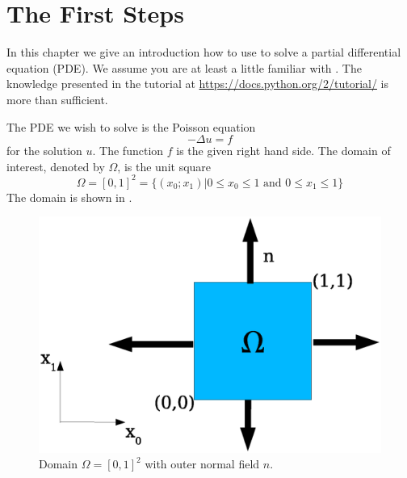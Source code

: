 
%
%
%

\section{The First Steps}\label{FirstSteps} 
In this chapter we give an introduction how to use \escript to solve 
a partial differential equation (PDE).
We assume you are at least a little familiar with \PYTHON.
The knowledge presented in the \PYTHON tutorial at \url{https://docs.python.org/2/tutorial/} is more than sufficient.

The PDE we wish to solve is the Poisson equation 
\begin{equation}
    -\Delta u=f 
    \label{eq:FirstSteps.1}
\end{equation}
for the solution $u$. The function $f$ is the given right hand side. The domain of interest, denoted by $\Omega$,
is the unit square 
\begin{equation}
\Omega=[0,1]^2=\{ (x_0;x_1) | 0\le x_{0} \le 1 \mbox{ and } 0\le x_{1} \le 1 \}
\label{eq:FirstSteps.1b}
\end{equation}
The domain is shown in .
\begin{figure}[ht]
    \centerline{\includegraphics{FirstStepDomain}}
    \caption{Domain $\Omega=[0,1]^2$ with outer normal field $n$.}
    \label{fig:FirstSteps.1}
\end{figure}


